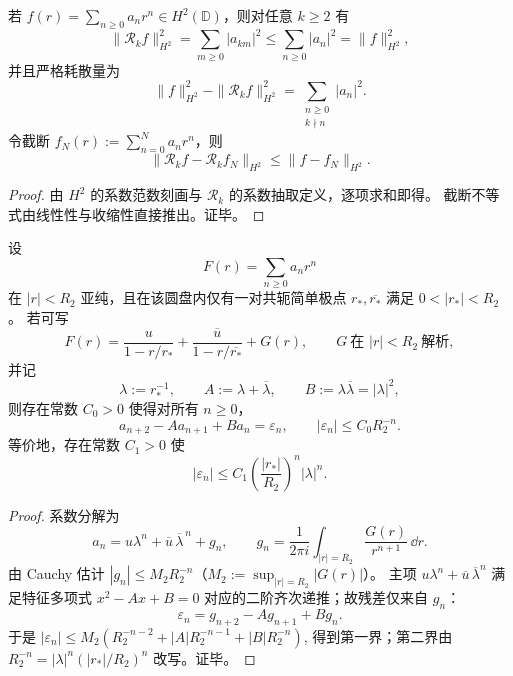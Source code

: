 \begin{proposition}\label{prop:xi-abel-H2-contraction-truncation-noamplify}
若 \(f(r)=\sum_{n\ge 0}a_n r^n\in H^2(\mathbb D)\)，则对任意 \(k\ge 2\) 有
\[
\|\mathcal R_k f\|_{H^2}^2=\sum_{m\ge 0}|a_{km}|^2\le \sum_{n\ge 0}|a_n|^2=\|f\|_{H^2}^2,
\]
并且严格耗散量为
\[
\|f\|_{H^2}^2-\|\mathcal R_k f\|_{H^2}^2
=\sum_{\substack{n\ge 0\\k\nmid n}}|a_n|^2.
\]
令截断 \(f_N(r):=\sum_{n=0}^{N}a_n r^n\)，则
\[
\|\mathcal R_k f-\mathcal R_k f_N\|_{H^2}\le \|f-f_N\|_{H^2}.
\]
\end{proposition}
\begin{proof}
由 \(H^2\) 的系数范数刻画与 \(\mathcal R_k\) 的系数抽取定义，逐项求和即得。
截断不等式由线性性与收缩性直接推出。证毕。
\end{proof}

\begin{theorem}[双共轭主极点的局部二阶递推与指数余项]\label{thm:xi-abel-local-ar2-dominant-conjugate-poles}
设
\[
F(r)=\sum_{n\ge 0}a_n r^n
\]
在 \(|r|<R_2\) 亚纯，且在该圆盘内仅有一对共轭简单极点
\(
r_\ast,\overline{r_\ast}
\)
满足 \(0<|r_\ast|<R_2\)。
若可写
\[
F(r)=\frac{u}{1-r/r_\ast}+\frac{\overline u}{1-r/\overline{r_\ast}}+G(r),
\qquad
G\ \text{在 }|r|<R_2\ \text{解析},
\]
并记
\[
\lambda:=r_\ast^{-1},\qquad
A:=\lambda+\overline\lambda,\qquad
B:=\lambda\overline\lambda=|\lambda|^2,
\]
则存在常数 \(C_0>0\) 使得对所有 \(n\ge 0\)，
\[
a_{n+2}-A a_{n+1}+B a_n=\varepsilon_n,\qquad
|\varepsilon_n|\le C_0R_2^{-n}.
\]
等价地，存在常数 \(C_1>0\) 使
\[
|\varepsilon_n|\le C_1\left(\frac{|r_\ast|}{R_2}\right)^n|\lambda|^n.
\]
\end{theorem}
\begin{proof}
系数分解为
\[
a_n=u\lambda^n+\overline u\,\overline\lambda^{\,n}+g_n,\qquad
g_n=\frac{1}{2\pi i}\int_{|r|=R_2}\frac{G(r)}{r^{n+1}}\,\dd r.
\]
由 Cauchy 估计 \(|g_n|\le M_2R_2^{-n}\)（\(M_2:=\sup_{|r|=R_2}|G(r)|\)）。
主项 \(u\lambda^n+\overline u\,\overline\lambda^n\) 满足特征多项式
\(
x^2-Ax+B=0
\)
对应的二阶齐次递推；故残差仅来自 \(g_n\)：
\[
\varepsilon_n=g_{n+2}-Ag_{n+1}+Bg_n.
\]
于是
\(
|\varepsilon_n|\le M_2(R_2^{-n-2}+|A|R_2^{-n-1}+|B|R_2^{-n})
\),
得到第一界；第二界由 \(R_2^{-n}=|\lambda|^n(|r_\ast|/R_2)^n\) 改写。证毕。
\end{proof}

